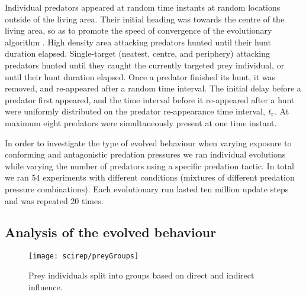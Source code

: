 Individual predators appeared at random time instants at random locations outside of the living area. Their initial heading was towards the centre of the living area, so as to promote the speed of convergence of the evolutionary algorithm \cite{olson2016evolution}. High density area attacking predators hunted until their hunt duration elapsed. Single-target (neatest, centre, and periphery) attacking predators hunted until they caught the currently targeted prey individual, or until their hunt duration elapsed. Once a predator finished its hunt, it was removed, and re-appeared after a random time interval. The initial delay before a predator first appeared, and the time interval before it re-appeared after a hunt were uniformly distributed on the predator re-appearance time interval, $t_\textnormal{r}$. At maximum eight predators were simultaneously present at one time instant. 

In order to investigate the type of evolved behaviour when varying exposure to conforming and antagonistic predation pressures we ran individual evolutions while varying the number of predators using a specific predation tactic. In total we ran 54 experiments with different conditions (mixtures of different predation pressure combinations). Each evolutionary run lasted ten million update steps and was repeated 20 times.

\subsection{Analysis of the evolved behaviour}

\begin{figure}
  \texttt{[image: scirep/preyGroups]}
  \caption{Prey individuals split into groups based on direct and indirect influence.}
  \label{figure:groups}
\end{figure}

